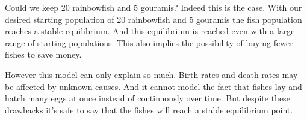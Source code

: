 \begin{flushleft}
    Could we keep 20 rainbowfish and 5 gouramis?
    Indeed this is the case. With our desired starting population of
    20 rainbowfish and 5 gouramis the fish population reaches a stable equilibrium.
    And this equilibrium is reached even with a large range of starting populations.
    This also implies the possibility of buying fewer fishes to save money.
\end{flushleft}

\begin{flushleft}
    However this model can only explain so much. Birth rates and death
    rates may be affected by unknown causes. And it cannot model the fact
    that fishes lay and hatch many eggs at once instead of continuously over time.
    But despite these drawbacks it's safe to say that the fishes will reach a stable
    equilibrium point.
\end{flushleft}